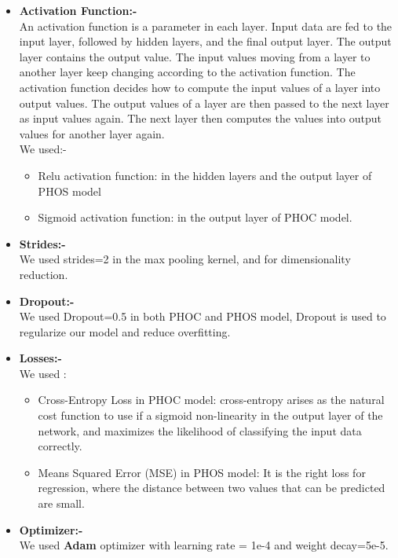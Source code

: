 \begin{itemize}[itemsep=1pt, topsep=5pt]
    \item \textbf{Activation Function:-}\\
     An activation function is a parameter in each layer. Input data are fed to the input layer, followed by hidden layers, and the final output layer. The output layer contains the output value. The input values moving from a layer to another layer keep changing according to the activation function. The activation function decides how to compute the input values of a layer into output values. The output values of a layer are then passed to the next layer as input values again. The next layer then computes the values into output values for another layer again.\\
     We used:-
     \begin{itemize}[itemsep=1pt, topsep=5pt]
        \item Relu activation function:
        in the hidden layers and the output layer of PHOS model 
        \item Sigmoid activation function:
        in the output layer of PHOC model.  
     \end{itemize} 
     \item \textbf{Strides:-}\\
     We used strides=2 in the max pooling kernel, and for dimensionality reduction.
    
     \item \textbf{Dropout:-}\\
     We used  Dropout=0.5 in both PHOC and PHOS model,
      Dropout is used to regularize our model and reduce overfitting.
    \item \textbf{Losses:-}\\
     We used :
     \begin{itemize}[itemsep=1pt, topsep=5pt]
        \item Cross-Entropy Loss in PHOC model: cross-entropy arises as the natural cost function to use if a sigmoid  non-linearity in the output layer of the network, and maximizes the likelihood of classifying the input data correctly.
        \item Means Squared Error (MSE) in PHOS model: It is the right loss for regression, where the distance between two
values that can be predicted are small.
     \end{itemize} 
     \item \textbf{Optimizer:-}\\
     We used \textbf{Adam} optimizer with learning rate = 1e-4 and weight decay=5e-5.
     

\end{itemize}

